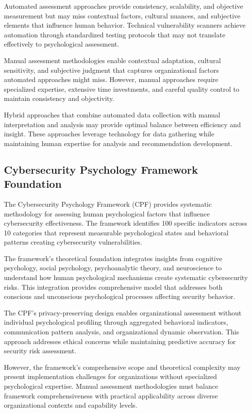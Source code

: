 \documentclass[10pt, twocolumn]{article}
\begin{document}
Automated assessment approaches provide consistency, scalability, and objective measurement but may miss contextual factors, cultural nuances, and subjective elements that influence human behavior. Technical vulnerability scanners achieve automation through standardized testing protocols that may not translate effectively to psychological assessment.

Manual assessment methodologies enable contextual adaptation, cultural sensitivity, and subjective judgment that captures organizational factors automated approaches might miss. However, manual approaches require specialized expertise, extensive time investments, and careful quality control to maintain consistency and objectivity.

Hybrid approaches that combine automated data collection with manual interpretation and analysis may provide optimal balance between efficiency and insight. These approaches leverage technology for data gathering while maintaining human expertise for analysis and recommendation development.

\subsection{Cybersecurity Psychology Framework Foundation}

The Cybersecurity Psychology Framework (CPF) provides systematic methodology for assessing human psychological factors that influence cybersecurity effectiveness\cite{canale2024}. The framework identifies 100 specific indicators across 10 categories that represent measurable psychological states and behavioral patterns creating cybersecurity vulnerabilities.

The framework's theoretical foundation integrates insights from cognitive psychology, social psychology, psychoanalytic theory, and neuroscience to understand how human psychological mechanisms create systematic cybersecurity risks. This integration provides comprehensive model that addresses both conscious and unconscious psychological processes affecting security behavior.

The CPF's privacy-preserving design enables organizational assessment without individual psychological profiling through aggregated behavioral indicators, communication pattern analysis, and organizational dynamic observation. This approach addresses ethical concerns while maintaining predictive accuracy for security risk assessment.

However, the framework's comprehensive scope and theoretical complexity may present implementation challenges for organizations without specialized psychological expertise. Manual assessment methodologies must balance framework comprehensiveness with practical applicability across diverse organizational contexts and capability levels.
\end{document}
